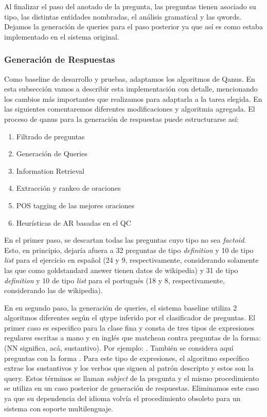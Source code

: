 Al finalizar el paso del anotado de la pregunta, las preguntas tienen asociado su tipo, las distintas entidades nombradas, el análisis gramatical y las qwords. Dejamos la generación de queries para el paso posterior ya que así es como estaba implementado en el sistema original.

\subsubsection{Generación de Respuestas}

Como baseline de desarrollo y pruebas, adaptamos los algoritmos de Qanus. En esta subsección vamos a describir esta implementación con detalle, mencionando los cambios más importantes que realizamos para adaptarla a la tarea elegida. En las siguientes comentaremos diferentes modificaciones y algoritmia agregada. El proceso de qanus para la generación de respuestas puede estructurarse así:
\begin{enumerate}
  \item Filtrado de preguntas
  \item Generación de Queries
  \item Information Retrieval
  \item Extracción y rankeo de oraciones
  \item POS tagging de las mejores oraciones
  \item Heurísticas de AR basadas en el QC
\end{enumerate}

En el primer paso, se descartan todas las preguntas cuyo tipo no sea \textit{factoid}. Esto, en principio, dejaría afuera a 32 preguntas de tipo \textit{definition} y 10 de tipo \textit{list} para el ejercicio en español (24 y 9, respectivamente, considerando solamente las que como goldstandard answer tienen datos de wikipedia) y 31 de tipo \textit{definition} y 10 de tipo \textit{list} para el portugués (18 y 8, respectivamente, considerando las de wikipedia).

En en segundo paso, la generación de queries, el sistema baseline utiliza 2 algoritmos diferentes según el qtype inferido por el clasificador de preguntas. El primer caso es especifico para la clase fina  y consta de tres tipos de expresiones regulares escritas a mano y en inglés que matchean contra preguntas de la forma:  (NN significa, acá, sustantivo). Por ejemplo: . También se considera aquí preguntas con la forma . Para este tipo de expresiones, el algoritmo específico extrae los sustantivos y los verbos que siguen al patrón descripto y estos son la query. Estos términos se llaman \textit{subject} de la pregunta y el mismo procedimiento se utiliza en un caso posterior de generación de respuestas. Eliminamos este caso ya que su dependencia del idioma volvía el procedimiento obsoleto para un sistema con soporte multilenguaje.

